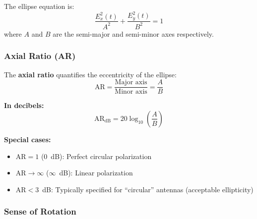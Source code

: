 The ellipse equation is:
\begin{equation}
\frac{E_x^2(t)}{A^2} + \frac{E_y^2(t)}{B^2} = 1
\label{eq:ellipse}
\end{equation}
where $A$ and $B$ are the semi-major and semi-minor axes respectively.

\begin{center}
\end{center}

\subsubsection{Axial Ratio (AR)}

The \textbf{axial ratio} quantifies the eccentricity of the ellipse:
\begin{equation}
\mathrm{AR} = \frac{\text{Major axis}}{\text{Minor axis}} = \frac{A}{B}
\label{eq:axial-ratio}
\end{equation}

\textbf{In decibels:}
\begin{equation}
\mathrm{AR}_{\text{dB}} = 20\log_{10}\left(\frac{A}{B}\right)
\label{eq:axial-ratio-db}
\end{equation}

\textbf{Special cases:}
\begin{itemize}
\item $\mathrm{AR} = 1$ (0~dB): Perfect circular polarization
\item $\mathrm{AR} \to \infty$ ($\infty$~dB): Linear polarization
\item $\mathrm{AR} < 3$~dB: Typically specified for ``circular'' antennas (acceptable ellipticity)
\end{itemize}

\subsubsection{Sense of Rotation}

